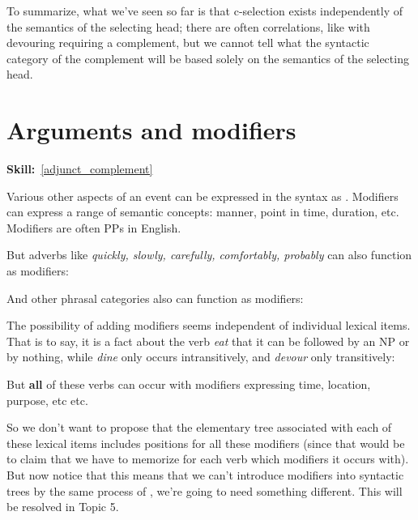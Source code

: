 \documentclass{article}
\begin{document}
To summarize, what we've seen so far is that c-selection exists independently of the semantics of the selecting head; there are often correlations, like with devouring requiring a complement, but we cannot tell what the syntactic category of the complement will be based solely on the semantics of the selecting head.

\section{Arguments and modifiers}
\hfill{}\textbf{Skill:}~\ref{adjunct_complement}

Various other aspects of an event can be expressed in the syntax as .
Modifiers can express a range of semantic concepts: manner, point in time, duration, etc.
Modifiers are often PPs in English.
\begin{exe}
\end{exe}
But adverbs like \emph{quickly, slowly, carefully, comfortably, probably} can also function as modifiers:
\begin{exe}
\end{exe}
And other phrasal categories also can function as modifiers:
\begin{exe}
\end{exe}
The possibility of adding modifiers seems independent of individual lexical items.
That is to say, it is a fact about the verb \emph{eat} that it can be followed by an NP or by nothing, while \emph{dine} only occurs intransitively, and \emph{devour} only transitively:
\begin{exe}
\end{exe}
But \textbf{all} of these verbs can occur with modifiers expressing time, location, purpose, etc etc.   
\begin{exe}
\end{exe}
So we don't want to propose that the elementary tree associated with each of these lexical items includes positions for all these modifiers (since that would be to claim that we have to memorize for each verb which modifiers it occurs with).
But now notice that this means that we can't introduce modifiers into syntactic trees by the same process of , we're going to need something different.
This will be resolved in Topic 5.
\end{document}
